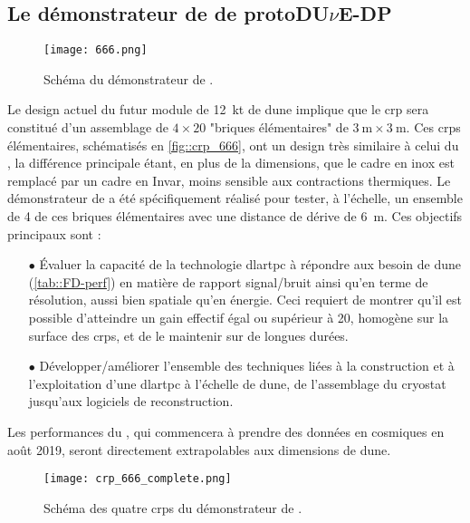     \subsection{Le démonstrateur de \SSS{} de proto\texorpdfstring{DU$\nu$E}{DUNE}-DP}

      \begin{figure}[!htb]
        \centering
        \texttt{[image: 666.png]}        
        \caption[Schéma du démonstrateur de \SSS{}]{\label{fig::666}Schéma du démonstrateur de \SSS{}.}
      \end{figure}

      Le design actuel du futur module de \SI{12}{\kilo\tonne}\cite{Acciarri2016a} de \gls{dune} implique que le \gls{crp} sera constitué d'un assemblage de $4\times20$ "briques élémentaires" de $\SI{3}{\meter}\times\SI{3}{\meter}$. Ces \glspl{crp} élémentaires, schématisés en \autoref{fig::crp_666}, ont un design très similaire à celui du \TOO{}, la différence principale étant, en plus de la dimensions, que le cadre en inox est remplacé par un cadre en Invar, moins sensible aux contractions thermiques. Le démonstrateur de \SSS{} a été spécifiquement réalisé pour tester, à l'échelle, un ensemble de 4 de ces briques élémentaires avec une distance de dérive de \SI{6}{\meter}. Ces objectifs principaux sont :
      \begin{itemize}
        \item[$\bullet$] Évaluer la capacité de la technologie \gls{dlartpc} à répondre aux besoin de \gls{dune} (\autoref{tab::FD-perf}) en matière de rapport signal/bruit ainsi qu'en terme de résolution, aussi bien spatiale qu'en énergie. Ceci requiert de montrer qu'il est possible d'atteindre un gain effectif égal ou supérieur à 20, homogène sur la surface des \glspl{crp}, et de le maintenir sur de longues durées.
        \item[$\bullet$] Développer/améliorer l'ensemble des techniques liées à la construction et à l'exploitation d'une \gls{dlartpc} à l'échelle de \gls{dune}, de l'assemblage du cryostat jusqu'aux logiciels de reconstruction.
      \end{itemize}
      Les performances du \SSS{}, qui commencera à prendre des données en cosmiques en août 2019, seront directement extrapolables aux dimensions de \gls{dune}.

      \begin{figure}[!htb]
        \centering
        \texttt{[image: crp\_666\_complete.png]}
        \caption[Schéma des CRPs du \SSS{}]{\label{fig::crp_666}Schéma des quatre \glspl{crp} du démonstrateur de \SSS{}.}
      \end{figure}

